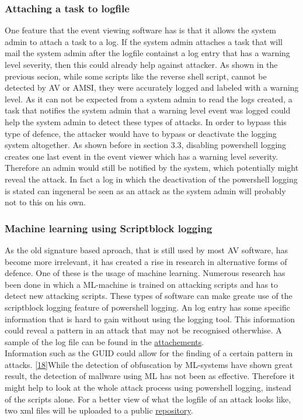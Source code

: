 \documentclass{article}%
\begin{document}
\subsubsection{Attaching a task to logfile}
One feature that the event viewing software has is that it allows the system admin to attach a task to a log. If the system admin attaches a task that will mail the system admin after the logfile containst a log entry that has a warning level severity, then this could already help against attacker. As shown in the previous secion, while some scripts like the reverse shell script, cannot be detected by AV or AMSI, they were accurately logged and labeled with a warning level. As it can not be expected from a system admin to read the logs created, a task that notifies the system admin that a warning level event was logged could help the system admin to detect these types of attacks. In order to bypass this type of defence, the attacker would have to bypass or deactivate the logging system altogether. As shown before in section $3.3$, disabling powershell logging creates one last event in the event viewer which has a warning level severity. Therefore an admin would still be notified by the system, which potentially might reveal the attack. In fact a log in which the deactivation of the powershell logging is stated can ingeneral be seen as an attack as the system admin will probably not to this on his own.
\subsubsection{Machine learning using Scriptblock logging}
As the old signature based aproach, that is still used by most AV software, has become more irrelevant, it has created a rise in research in alternative forms of defence. One of these is the usage of machine learning. Numerous research has been done in which a ML-machine is trained on attacking scripts and has to detect new attacking scripts. These types of software can make greate use of the scriptblock logging feature of powershell logging. An log entry has some specific information that is hard to gain without using the logging tool. This information could reveal a pattern in an attack that may not be recognised otherwhise. A sample of the log file can be found in the \hyperlink{output2}{attachements}.\\
Information such as the GUID could allow for the finding of a certain pattern in attacks. [\hyperlink{18}{18}]While the detection of obfuscation by ML-systems have shown great result, the detection of mallware using ML has not been as effective. Therefore it might help to look at the whole attack process using powershell logging, instead of the scripts alone. For a better view of what the logfile of an attack looks like, two xml files will be uploaded to a public \href{https://github.com/ZamirAmiri/Obfuscation}{repository}.
\end{document}
